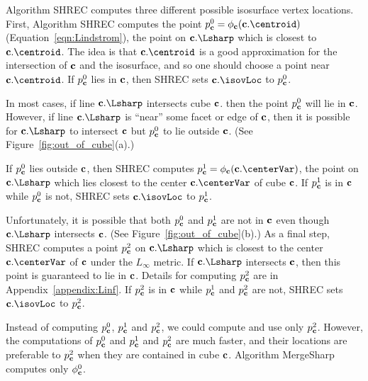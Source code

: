 Algorithm SHREC computes three different possible isosurface vertex locations.
First, Algorithm SHREC computes the point $p^0_\cb = \phi_\cb(\cb.\centroid)$
(Equation~\ref{eqn:Lindstrom}),
the point on $\cb.\Lsharp$ which is closest to $\cb.\centroid$.
The idea is that $\cb.\centroid$ is a good approximation
for the intersection of $\mathbf{c}$ and the isosurface,
and so one should choose a point near $\cb.\centroid$.
If $p^0_{\mathbf{c}}$ lies in $\mathbf{c}$, then SHREC sets $\cb.\isovLoc$ to $p^0_{\mathbf{c}}$.

In most cases, if line $\cb.\Lsharp$ intersects cube $\mathbf{c}$.
then the point $p^0_{\mathbf{c}}$ will lie in $\mathbf{c}$.
However, if line $\cb.\Lsharp$ is ``near'' some facet or edge of $\mathbf{c}$,
then it is possible for $\cb.\Lsharp$ to intersect $\mathbf{c}$
but $p^0_{\mathbf{c}}$ to lie outside $\mathbf{c}$.
(See Figure~\ref{fig:out_of_cube}(a).)

If $p^0_{\mathbf{c}}$ lies outside $\mathbf{c}$,
then SHREC computes $p^1_\cb = \phi_\cb(\cb.\centerVar)$, 
the point on $\cb.\Lsharp$ which lies closest 
to the center $\cb.\centerVar$ of cube $\mathbf{c}$.
If $p^1_{\mathbf{c}}$ is in $\mathbf{c}$ while $p^0_{\mathbf{c}}$ is not,
SHREC sets $\cb.\isovLoc$ to $p^1_{\mathbf{c}}$.

Unfortunately, it is possible that both $p^0_{\mathbf{c}}$ and $p^1_{\mathbf{c}}$
are not in $\mathbf{c}$ even though $\cb.\Lsharp$ intersects $\mathbf{c}$.
(See Figure~\ref{fig:out_of_cube}(b).)
As a final step, SHREC computes a point $p^2_{\mathbf{c}}$ on $\cb.\Lsharp$ 
which is closest to the center $\cb.\centerVar$ of $\mathbf{c}$ 
under the $L_\infty$ metric.
If $\cb.\Lsharp$ intersects $\mathbf{c}$, 
then this point is guaranteed to lie in $\mathbf{c}$.
Details for computing $p^2_{\mathbf{c}}$ are in Appendix~\ref{appendix:Linf}.
If $p^2_{\mathbf{c}}$ is in $\mathbf{c}$ while $p^1_{\mathbf{c}}$ and $p^2_{\mathbf{c}}$ are not,
SHREC sets $\cb.\isovLoc$ to $p^2_{\mathbf{c}}$.

Instead of computing $p^0_{\mathbf{c}}$, $p^1_{\mathbf{c}}$ and $p^2_{\mathbf{c}}$,
we could compute and use only $p^2_{\mathbf{c}}$.
However, the computations of $p^0_{\mathbf{c}}$ and $p^1_{\mathbf{c}}$ and $p^2_{\mathbf{c}}$ 
are much faster,
and their locations are preferable to $p^2_{\mathbf{c}}$ when they are
contained in cube $\mathbf{c}$.
Algorithm MergeSharp computes only $\phi^0_{\mathbf{c}}$.


